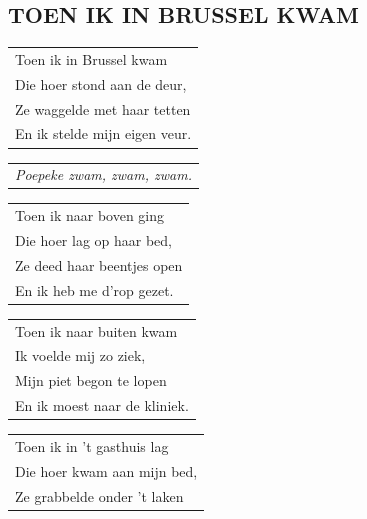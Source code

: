 \documentclass{article}
\begin{document}
\subsection*{TOEN IK IN BRUSSEL KWAM}
\begin{flushleft}
\begin{tabularx}{0.8\textwidth} {
   >{\raggedright\arraybackslash}X}
   Toen ik in Brussel kwam\\
Die hoer stond aan de deur,\\
Ze waggelde met haar tetten\\
En ik stelde mijn eigen veur.\\
\end{tabularx}
\end{flushleft}\begin{flushleft}
\begin{tabularx}{0.8\textwidth} {
   >{\raggedright\arraybackslash}X}
\textit{Poepeke zwam, zwam, zwam.}\\
\end{tabularx}
\end{flushleft}\begin{flushleft}
\begin{tabularx}{0.8\textwidth} {
   >{\raggedright\arraybackslash}X}
   Toen ik naar boven ging\\
Die hoer lag op haar bed,\\
Ze deed haar beentjes open\\
En ik heb me d’rop gezet.\\
\end{tabularx}
\end{flushleft}\begin{flushleft}
\begin{tabularx}{0.8\textwidth} {
   >{\raggedright\arraybackslash}X}Toen ik naar buiten kwam\\
Ik voelde mij zo ziek,\\
Mijn piet begon te lopen\\
En ik moest naar de kliniek.\\
\end{tabularx}
\end{flushleft}\begin{flushleft}
\begin{tabularx}{0.8\textwidth} {
   >{\raggedright\arraybackslash}X}Toen ik in ’t gasthuis lag\\
Die hoer kwam aan mijn bed,\\
Ze grabbelde onder ’t laken\\

\end{tabularx}
\end{flushleft}
\end{document}
